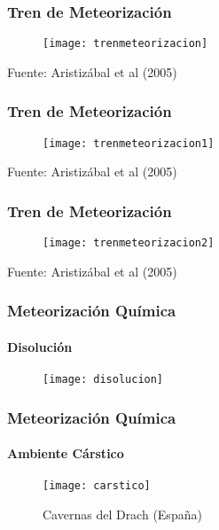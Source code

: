 \documentclass{beamer}
\begin{document}
\begin{frame}
\frametitle{Tren de Meteorización}
\begin{figure}
\begin{center}
   	\texttt{[image: trenmeteorizacion]}
\end{center}
\end{figure}
\tiny{Fuente: Aristizábal et al (2005)}
\end{frame}
\begin{frame}
\frametitle{Tren de Meteorización}
\begin{figure}
\begin{center}
   	\texttt{[image: trenmeteorizacion1]}
\end{center}
\end{figure}
\tiny{Fuente: Aristizábal et al (2005)}
\end{frame}
\begin{frame}
\frametitle{Tren de Meteorización}
\begin{figure}
\begin{center}
   	\texttt{[image: trenmeteorizacion2]}
\end{center}
\end{figure}
\tiny{Fuente: Aristizábal et al (2005)}
\end{frame}
\begin{frame}
\frametitle{Meteorización Química}
\framesubtitle{Disolución}
\begin{figure}
\begin{center}
   	\texttt{[image: disolucion]}
\end{center}
\end{figure}
\end{frame}
\begin{frame}
\frametitle{Meteorización Química}
\framesubtitle{Ambiente Cárstico}
\begin{figure}
\begin{center}
   	\texttt{[image: carstico]}
\end{center}
\caption{Cavernas del Drach (España)}
\end{figure}
\end{frame}
\end{document}
